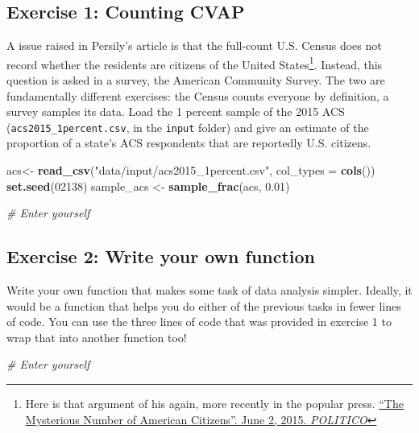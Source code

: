 \documentclass[]{book}
\newenvironment{Shaded}{\begin{snugshade}}{\end{snugshade}}
\newcommand{\KeywordTok}[1]{\textcolor[rgb]{0.13,0.29,0.53}{\textbf{#1}}}
\newcommand{\DataTypeTok}[1]{\textcolor[rgb]{0.13,0.29,0.53}{#1}}
\newcommand{\DecValTok}[1]{\textcolor[rgb]{0.00,0.00,0.81}{#1}}
\newcommand{\FloatTok}[1]{\textcolor[rgb]{0.00,0.00,0.81}{#1}}
\newcommand{\StringTok}[1]{\textcolor[rgb]{0.31,0.60,0.02}{#1}}
\newcommand{\CommentTok}[1]{\textcolor[rgb]{0.56,0.35,0.01}{\textit{#1}}}
\newcommand{\NormalTok}[1]{#1}
\let\rmarkdownfootnote\footnote%
\def\footnote{\protect\rmarkdownfootnote}
\theoremstyle{definition}
\theoremstyle{definition}
\theoremstyle{definition}
\theoremstyle{remark}
\begin{document}
\subsection*{Exercise 1: Counting CVAP}\label{exercise-1-counting-cvap}

A issue raised in Persily's article is that the full-count U.S. Census
does not record whether the residents are citizens of the United
States\footnote{Here is that argument of his again, more recently in the
  popular press.
  \href{http://www.politico.com/magazine/story/2015/06/the-supreme-courts-big-data-problem-118568}{``The
  Mysterious Number of American Citizens''. June 2, 2015.
  \emph{POLITICO}}}. Instead, this question is asked in a survey, the
American Community Survey. The two are fundamentally different
exercises: the Census counts everyone by definition, a survey samples
its data. Load the 1 percent sample of the 2015 ACS
(\texttt{acs2015\_1percent.csv}, in the \texttt{input} folder) and give
an estimate of the proportion of a state's ACS respondents that are
reportedly U.S. citizens.

\begin{Shaded}
\begin{Highlighting}[]
\NormalTok{acs<-}\StringTok{ }\KeywordTok{read_csv}\NormalTok{(}\StringTok{"data/input/acs2015_1percent.csv"}\NormalTok{, }\DataTypeTok{col_types =} \KeywordTok{cols}\NormalTok{())}
\KeywordTok{set.seed}\NormalTok{(}\DecValTok{02138}\NormalTok{)}
\NormalTok{sample_acs <-}\StringTok{ }\KeywordTok{sample_frac}\NormalTok{(acs, }\FloatTok{0.01}\NormalTok{)}

\CommentTok{# Enter yourself}
\end{Highlighting}
\end{Shaded}

\subsection*{Exercise 2: Write your own
function}\label{exercise-2-write-your-own-function}

Write your own function that makes some task of data analysis simpler.
Ideally, it would be a function that helps you do either of the previous
tasks in fewer lines of code. You can use the three lines of code that
was provided in exercise 1 to wrap that into another function too!

\begin{Shaded}
\begin{Highlighting}[]
\CommentTok{# Enter yourself}
\end{Highlighting}
\end{Shaded}
\end{document}
